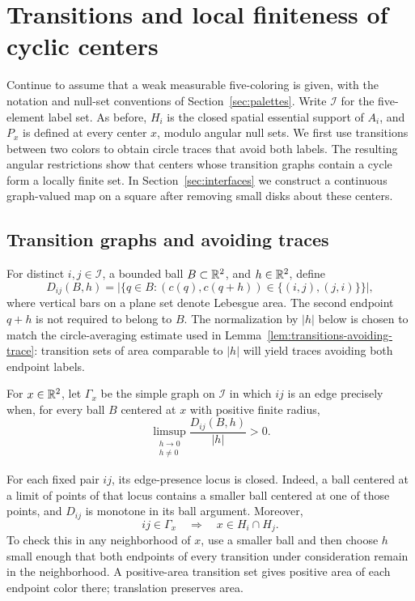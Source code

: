\section{Transitions and local finiteness of cyclic centers}
\label{sec:transitions}

Continue to assume that a weak measurable five-coloring is given, with
the notation and null-set conventions of Section~\ref{sec:palettes}.
Write $\mathcal I$ for the five-element label set.  As before, $H_i$ is the
closed spatial essential support of $A_i$, and $P_x$ is defined at every
center $x$, modulo angular null sets.  We first use transitions between two colors to obtain circle traces
that avoid both labels.  The resulting angular restrictions show that
centers whose transition graphs contain a cycle form a locally finite
set.  In Section~\ref{sec:interfaces} we construct a continuous
graph-valued map on a square after removing small disks about these
centers.

\subsection{Transition graphs and avoiding traces}

For distinct $i,j\in\mathcal I$, a bounded ball $B\subset\mathbb R^2$, and
$h\in\mathbb R^2$, define
\[
 D_{ij}(B,h)=\bigl|\{q\in B:
    (c(q),c(q+h))\in\{(i,j),(j,i)\}\}\bigr|,
\]
where vertical bars on a plane set denote Lebesgue area.  The second
endpoint $q+h$ is not required to belong to $B$.  The normalization by
$|h|$ below is chosen to match the circle-averaging estimate used in
Lemma~\ref{lem:transitions-avoiding-trace}: transition sets of area
comparable to $|h|$ will yield traces avoiding both endpoint labels.

\begin{definition}
\label{def:transitions-graph}
For $x\in\mathbb R^2$, let $\Gamma_x$ be the simple graph on $\mathcal I$ in
which $ij$ is an edge precisely when, for every ball $B$ centered at $x$
with positive finite radius,
\begin{equation}
 \limsup_{\substack{h\to0\\h\ne0}}
       \frac{D_{ij}(B,h)}{|h|}>0.
 \label{eq:source-14}
\end{equation}
\end{definition}

For each fixed pair $ij$, its edge-presence locus is closed.  Indeed, a
ball centered at a limit of points of that locus contains a smaller
ball centered at one of those points, and $D_{ij}$ is monotone in its
ball argument.  Moreover,
\[
 ij\in\Gamma_x\quad\Longrightarrow\quad x\in H_i\cap H_j.
\]
To check this in any neighborhood of $x$, use a smaller ball and then
choose $h$ small enough that both endpoints of every transition under
consideration remain in the neighborhood.  A positive-area transition
set gives positive area of each endpoint color there; translation
preserves area.

